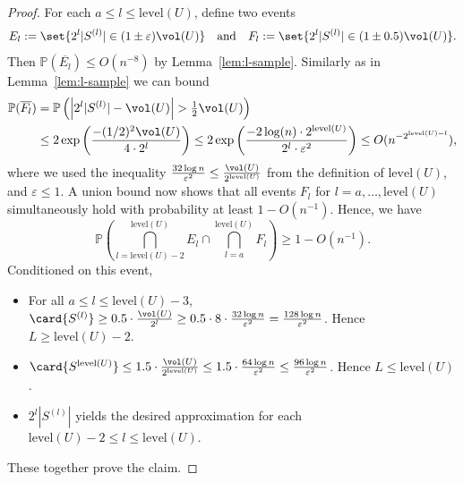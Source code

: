 \documentclass[a4paper, 11pt]{article}
\newcommand{\level}{\mathrm{level}}
\newcommand{\eps}{\varepsilon}
\renewcommand{\Pr}{\mathbb{P}}
\begin{document}
\begin{proof}
    For each $a \leq l \leq \level(U)$, define two events
    \[
        E_l := \set{2^l |S^{(l)}| \in (1 \pm \eps) \vol(U)} \quad\text{and}\quad
        F_l := \set{2^l |S^{(l)}| \in (1 \pm 0.5) \vol(U)}.
    \]
    Then $\Pr(\overline{E_l}) \leq O(n^{-8})$ by Lemma~\ref{lem:l-sample}. Similarly as in Lemma~\ref{lem:l-sample} we can bound 
    \begin{align*}
        \Pr(\overline{F_l})
        &= \Pr \left( \left| 2^l |S^{(l)}| - \vol(U) \right| > \tfrac 12 \vol(U) \right) \\
        &\leq 2\exp\left( \frac{-(1/2)^2 \vol(U)}{4 \cdot 2^l} \right)
        \leq 2\exp\left( \frac{-2 \log(n) \cdot 2^{\level(U)}}{2^l \cdot \eps^2} \right)
        \leq O(n^{-2^{\level(U)-l}}),
    \end{align*}
    where we used the inequality $\frac{32 \log n}{\eps^2} \leq \frac{\vol(U)}{2^{\level(U)}}$ from the definition of $\level(U)$, and $\eps \le 1$. A union bound now shows that all events $F_l$ for $l = a,\ldots,\level(U)$ simultaneously hold with probability at least $1 - O(n^{-1})$. Hence, we have
    \[
        \Pr\left( \bigcap_{l=\level(U)-2}^{\level(U)} E_l \cap \bigcap_{l=a}^{\level(U)} F_l \right)
        \geq 1 - O(n^{-1}).
    \]
    Conditioned on this event,
    \begin{itemize}
        \item For all $a \leq l \leq \level(U) - 3$, $\card{S^{(l)}} \geq 0.5 \cdot \frac{\vol(U)}{2^l} \geq 0.5 \cdot 8 \cdot \frac{32 \log n}{\eps^2} = \frac{128 \log n}{\eps^2}$. Hence $L \geq \level(U) - 2$.
        \item $\card{S^{\level(U)}} \leq 1.5 \cdot \frac{\vol(U)}{2^{\level(U)}} \leq 1.5 \cdot \frac{64 \log n}{\eps^2} \leq \frac{96 \log n}{\eps^2}$. Hence $L \leq \level(U)$.
        \item $2^l |S^{(l)}|$ yields the desired approximation for each $\level(U) - 2 \le l \le \level(U)$.
    \end{itemize}
    These together prove the claim.
\end{proof}
\end{document}
